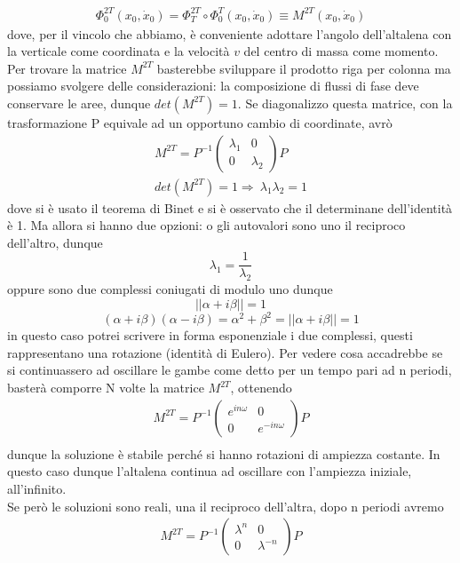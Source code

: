 \documentclass[
10pt, %
a4paper, %
oneside, %
headinclude,footinclude, %
BCOR5mm, %
]{scrartcl}
\begin{document}
\begin{align*}
	\Phi_0^{2T}(x_0, \dot{x}_0) =  \Phi^{2T}_T\circ \Phi^{T}_0(x_0, \dot{x}_0) \equiv M^{2T}(x_0, \dot{x}_0)
\end{align*}
dove, per il vincolo che abbiamo, è conveniente adottare l'angolo dell'altalena con la verticale come coordinata e la velocità $v$ del centro di massa come momento. Per trovare la matrice \(M^{2T}\) basterebbe sviluppare il prodotto riga per colonna ma possiamo svolgere delle considerazioni: la composizione di flussi di fase deve conservare le aree, dunque \(det(M^{2T}) = 1\). Se diagonalizzo questa matrice, con la trasformazione P equivale ad un opportuno cambio di coordinate, avrò
\begin{align*}
	M^{2T} = P^{-1}
	\begin{pmatrix}
		\lambda_1&0\\
		0&\lambda_2
	\end{pmatrix} P\\
	det(M^{2T}) = 1 \Rightarrow\ \lambda_1\lambda_2 = 1
\end{align*}
dove si è usato il teorema di Binet e si è osservato che il determinane dell'identità è 1. Ma allora si hanno due opzioni: o gli autovalori sono uno il reciproco dell'altro, dunque
\[\lambda_1  = \frac{1}{\lambda_2}\]
oppure sono due complessi coniugati di modulo uno dunque
\[||\alpha+i\beta|| = 1\]
\[(\alpha+i\beta)(\alpha - i \beta) = \alpha^2+\beta^2 = ||\alpha + i \beta|| = 1\]
in questo caso potrei scrivere in forma esponenziale i due complessi, questi rappresentano una rotazione (identità di Eulero). Per vedere cosa accadrebbe se si continuassero ad oscillare le gambe come detto per un tempo pari ad n periodi, basterà comporre N volte la matrice \(M^{2T}\), ottenendo
\begin{align*}
	M^{2T} = P^{-1}
	\begin{pmatrix}
		e^{in\omega}&0\\
		0&e^{-in\omega}
	\end{pmatrix} P\\
\end{align*}
dunque la soluzione è stabile perché si hanno rotazioni di ampiezza costante. In questo caso dunque l'altalena continua ad oscillare con l'ampiezza iniziale, all'infinito.\\
Se però le soluzioni sono reali, una il reciproco dell'altra, dopo n periodi avremo
\begin{align*}
	M^{2T} = P^{-1}
	\begin{pmatrix}
		\lambda^n&0\\
		0&\lambda^{-n}
	\end{pmatrix} P\\
\end{align*}
\end{document}
